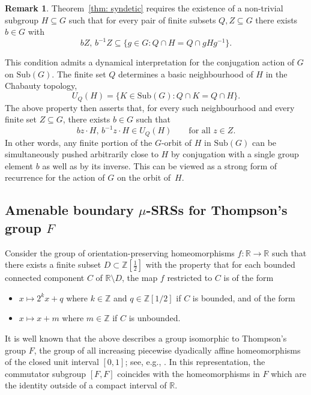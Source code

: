 \documentclass[reqno,a4paper,11pt]{amsart}
\numberwithin{equation}{section}
\newcommand{\1}{\mathbf{1}}
\def\R{{\mathbb R}}
\def\Z{{\mathbb Z}}
\newcommand{\sub}[1]{\mathrm{Sub}(#1)}
\theoremstyle{definition}
\newtheorem{rmk}[teo]{Remark}
\begin{document}
	\begin{rmk}\label{remark: dynamical interpretation}
		Theorem~\ref{thm: syndetic} requires the existence of a non-trivial subgroup $H \subseteq G$ such that for every pair of finite subsets $Q, Z \subseteq G$ there exists $b \in G$ with
		\[
		bZ,\, b^{-1}Z \subseteq \{ g \in G : Q \cap H = Q \cap gHg^{-1} \}.
		\]
		
		This condition admits a dynamical interpretation for the conjugation action of $G$ on $\mathrm{Sub}(G)$. The finite set $Q$ determines a basic neighbourhood of $H$ in the Chabauty topology,
		\[
		U_Q(H) = \{K \in \sub{G} : Q \cap K = Q \cap H\}.
		\]
		The above property then asserts that, for every such neighbourhood and every finite set $Z \subseteq G$, there exists $b \in G$ such that
		\[
		bz \cdot H,\, b^{-1}z \cdot H \in U_Q(H)
		\qquad \text{for all } z \in Z .
		\]
		In other words, any finite portion of the $G$-orbit of $H$ in $\mathrm{Sub}(G)$ can be simultaneously pushed arbitrarily close to $H$ by conjugation with a single group element $b$ as well as by its inverse. This can be viewed as a strong form of recurrence for the action of $G$ on the orbit of~$H$.
	\end{rmk}

	
	\subsection{Amenable boundary $\mu$-SRSs for Thompson's group $F$}
	
	Consider the group of orientation-preserving homeomorphisms $f \colon \R\to \R$ such that there exists a finite subset $D \subset \Z\left[\frac{1}{2}\right]$ with the property that for each bounded connected component $C$ of $\R \setminus D$, the map $f$ restricted to $C$ is of the form
	\begin{itemize}
		\item $x \mapsto 2^kx + q$ where $k \in \Z$ and $q \in \Z[1/2]$ if $C$ is bounded, and of the form
		\item $x \mapsto x + m$ where $m \in \Z$ if $C$ is unbounded.
	\end{itemize}
	It is well known that the above describes a group isomorphic to Thompson's group $F$, the group of all increasing piecewise dyadically affine homeomorphisms of the closed unit interval $[0,1]$; see, e.g., \cite[Section 3.1]{BelkBrown2005}. In this representation, the commutator subgroup $[F,F]$ coincides with the homeomorphisms in $F$ which are the identity outside of a compact interval of $\R$.
	
\end{document}
